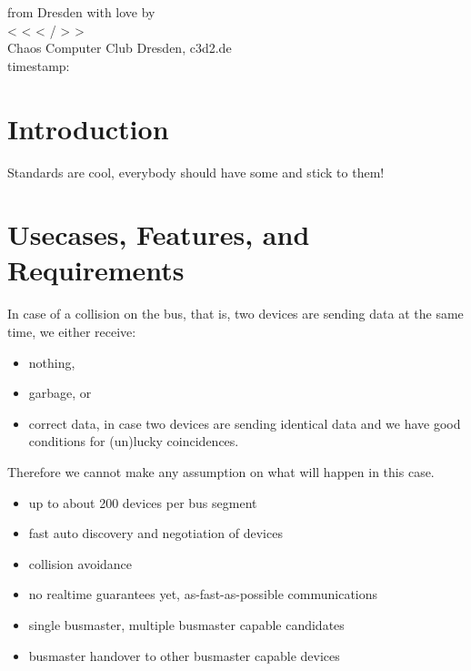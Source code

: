 \documentclass[a4paper,12pt]{scrartcl}
\title{\haqbus}
\author{C3D2}
\date{}
\newcommand{\haqbus}{ha\textsuperscript{q}\textsubscript{b}us}
\begin{document}
\maketitle

\begin{abstract}
This is the very first draft of the \haqbus protocol specification. The haqbus is an EIA-485 (aka RS-485) based field communication system connecting arbitrary devices for hackerspace-automation.
\end{abstract}

\vspace{5cm}
\thispagestyle{empty}
\begin{center}
from Dresden with love by \\
\Large
< < < / > >  \\
\Large
Chaos Computer Club Dresden, c3d2.de \\
 timestamp:   
\end{center}

\newpage
\tableofcontents
\newpage
\section{Introduction}
Standards are cool, everybody should have some and stick to them!

\section{Usecases, Features, and Requirements}

In case of a collision on the bus, that is, two devices are sending data at the same time, we either receive:
\begin{itemize}
\item nothing,
\item garbage, or
\item correct data, in case two devices are sending identical data and we have good conditions for (un)lucky coincidences.
\end{itemize}
Therefore we cannot make any assumption on what will happen in this case.

\begin{itemize}
\item up to about 200 devices per bus segment
\item fast auto discovery and negotiation of devices
\item collision avoidance
\item no realtime guarantees yet, as-fast-as-possible communications
\item single busmaster, multiple busmaster capable candidates
\item busmaster handover to other busmaster capable devices

\end{itemize}
\end{document}
